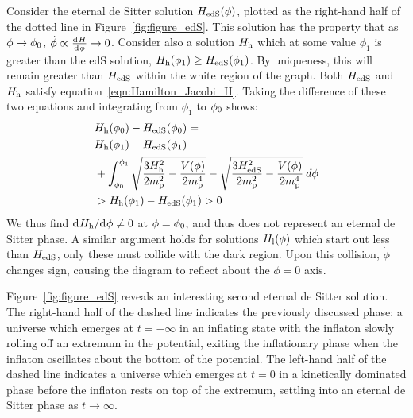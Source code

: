 Consider the eternal de Sitter solution \(H_\mathrm{edS}(\phi)\), plotted as the right-hand half of the dotted line in Figure~\ref{fig:figure_edS}.  This solution has the property that as \(\phi\to\phi_0\), \(\dot{\phi}\propto\frac{\operatorname{d}^{}\!{H}}{\operatorname{d}^{}\!{\phi}}\to0\). Consider also a solution \(H_\mathrm{h}\) which at some value \(\phi_1\) is greater than the edS solution, \(H_\mathrm{h}(\phi_1) \ge H_\mathrm{edS}(\phi_1)\). By uniqueness, this will remain greater than \(H_\mathrm{edS}\) within the white region of the graph. Both \(H_\mathrm{edS}\) and \(H_\mathrm{h}\) satisfy equation~\eqref{eqn:Hamilton_Jacobi_H}.  Taking the difference of these two equations and integrating from \(\phi_1\) to \(\phi_0\) shows:
%
\begin{align}
  &H_\mathrm{h}(\phi_0)-H_\mathrm{edS}(\phi_0)= \nonumber\\
  &H_\mathrm{h}(\phi_1)-H_\mathrm{edS}(\phi_1) \nonumber\\
  & + \int_{\phi_0}^{\phi_1} 
  \sqrt{\frac{3H_\mathrm{h}^2}{2m_{\mathrm{p}}^2} - 
  \frac{V(\phi)}{2m_{\mathrm{p}}^4}}-\sqrt{\frac{3H_\mathrm{edS}^2}{2m_{\mathrm{p}}^2} - 
  \frac{V(\phi)}{2m_{\mathrm{p}}^4}}\:d\phi \nonumber \\
  &>H_\mathrm{h}(\phi_1)-H_\mathrm{edS}(\phi_1)>0 \nonumber
\end{align}
%
We thus find \({\operatorname{d}^{}\!{H_\mathrm{h}}}/{\operatorname{d}^{}\!{\phi}}\ne0\) at \(\phi=\phi_0\), and thus does not represent an eternal de Sitter phase. A similar argument holds for solutions \(H_\mathrm{l}(\phi)\) which start out less than \(H_\mathrm{edS}\), only these must collide with the dark region. Upon this collision, \(\dot{\phi}\) changes sign, causing the diagram to reflect about the \(\phi=0\) axis.

Figure~\ref{fig:figure_edS} reveals an interesting second eternal de Sitter solution. The right-hand half of the dashed line indicates the previously discussed phase: a universe which emerges at \(t=-\infty\) in an inflating state with the inflaton slowly rolling off an extremum in the potential, exiting the inflationary phase when the inflaton oscillates about the bottom of the potential.  The left-hand half of the dashed line indicates a universe which emerges at \(t=0\) in a kinetically dominated phase before the inflaton rests on top of the extremum, settling into an eternal de Sitter phase as \(t\to\infty\).

